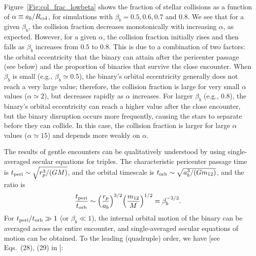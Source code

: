 \documentclass[twocolumn]{aastex631}
\begin{document}
Figure~\ref{Fig:col_frac_lowbeta} shows the fraction of stellar collisions as a function of $\alpha \equiv a_b / R_{\rm col}$, for simulations with $\beta_b=0.5, 0.6, 0.7$ and $0.8$.
We see that for a given $\beta_b$, the collision fraction decreases monotonically with increasing $\alpha$, as expected.
However, for a given $\alpha$, the collision fraction initially rises and then falls as $\beta_b$ increases from $0.5$ to $0.8$. 
This is due to a combination of two factors: the orbital eccentricity that the binary can attain after the pericenter passage (see below) and the proportion of binaries that survive the close encounter.
When $\beta_b$ is small (e.g., $\beta_b \simeq 0.5$), the binary's orbital eccentricity generally does not reach a very large value; 
therefore, the collision fraction is large for very small $\alpha$ values ($\alpha \simeq 2$), but decreases rapidly as $\alpha$ increases.
For larger $\beta_b$ (e.g., $0.8$), the binary's orbital eccentricity can reach a higher value after the close encounter, but the binary disruption occurs more frequently, causing the stars to separate before they can collide. 
In this case, the collision fraction is larger for large $\alpha$ values ($\alpha \simeq 15$) and depends more weakly on $\alpha$.

The results of gentle encounters can be qualitatively understood by using single-averaged secular equations for triples.
The characteristic pericenter passage time is $t_{\rm peri} \sim \sqrt{r_p^3/(GM)}$, and the orbital timescale is $t_{\rm orb} \sim \sqrt{a_b^3/(Gm_{12})}$, and the ratio is
\begin{equation}
    \frac{t_{\rm peri}}{t_{\rm orb}}\sim \Big( \frac{r_p}{a_b} \Bigr)^{3/2}\Big( \frac{m_{12}}{M} \Bigr)^{1/2} = \beta_b^{-3/2}.
\label{eq:periods}
\end{equation}
For $t_{\rm peri}/t_{\rm orb} \gg 1$ (or $\beta_b \ll 1$), the internal orbital motion of the binary can be averaged across the entire encounter, and single-averaged secular equations of motion can be obtained.
To the leading (quadruple) order, we have [see Eqs.~(28), (29) in \citealt{Liu2018ApJ}]:
\end{document}
